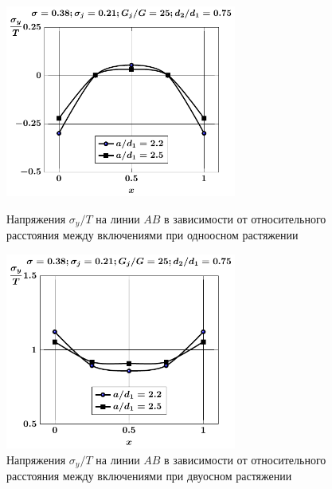 \begin{figure}[h!]
\centering\footnotesize
\parbox[b]{7.5cm}{\centering\includegraphics[width=7.6cm]{inc9-a-d75-g25-t1-sig_y.pdf}
\caption{Напряжения $\sigma_y/T$ на линии $AB$ в зависимости от относительного расстояния между включениями при одноосном растяжении
\label{f:9:71}}}\hfil\hfil
\parbox[b]{7.5cm}{\centering\includegraphics[width=7.6cm]{inc9-a-d75-g25-t2-sig_y.pdf}
\caption{Напряжения $\sigma_y/T$ на линии $AB$ в зависимости от относительного расстояния между включениями при двуосном растяжении
\label{f:9:72}}}
\end{figure}

